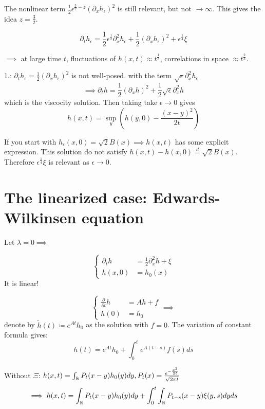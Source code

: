 The nonlinear term $\frac{1}{2}\epsilon^{\frac{3}{2}-z}(\partial_x h_\epsilon)^2$ is still relevant, but not $\to\infty$. This gives the idea 
$z=\frac{3}{2}$.

\[\partial_t h_\epsilon = \frac{1}{2}\epsilon^{\frac{1}{2}}\partial_x^2 h_\epsilon + \frac{1}{2}(\partial_x h_\epsilon)^2 + \epsilon^{\frac{1}{4}}\xi\]

$\implies$ at large time $t$, fluctuations of $h(x,t)\approx t^{\frac{1}{3}}$, correlations in space $\approx t^\frac{2}{3}$.


1.: $\partial_t h_\epsilon = \frac{1}{2}(\partial_x h_\epsilon)^2$ is not well-posed.
with the term $\sqrt{\epsilon}\partial_x^2 h_\epsilon$
\[\implies \partial_t h = \frac{1}{2}(\partial_x h)^2+\frac{1}{2}\sqrt{\epsilon}\partial_x^2h\]
which is the viscocity solution. Then taking take $\epsilon\to 0$ gives \[h(x,t)=\sup_{y}(h(y,0)-\frac{(x-y)^2}{2t})\]

If you start with $h_\epsilon(x,0)=\sqrt{2}B(x)\implies h(x,t)$ has some explicit expression. This solution 
do not satisfy $h(x,t)-h(x,0)\stackrel{d}{=}\sqrt{2}B(x)$. Therefore $\epsilon^{\frac{1}{4}}\xi$ is relevant as $\epsilon\to 0$.

\section{The linearized case: Edwards-Wilkinsen equation}

Let $\lambda=0\implies$

\begin{equation}\label{Edwards-Wilkinsen}
    \begin{cases}
        \partial_t h  &= \frac{1}{2}\partial_x^2 h+\xi\\
        h(x,0)&=h_0(x)
    \end{cases}
\end{equation}
It is linear!
\begin{remark}
    \[\begin{cases}
        \frac{\partial}{\partial t}h &= Ah +f\\
        h(0)&=h_0
    \end{cases}\implies\]
    denote by $\tilde{h}(t)\coloneqq e^{At}h_0$ as the solution with $f=0$. The variation of constant formula gives:
    \[h(t)=e^{At}h_0+\int_0^te^{A(t-s)}f(s)ds\]

Without $\Xi$: $h(x,t)=\int_{\mathbb{R}} P_t(x-y)h_0(y)dy,P_t(x)=\frac{e^{-\frac{x^2}{2t}}}{\sqrt{2\pi t}}$
\[\implies h(x,t)=\int_{\mathbb{R}} P_t(x-y)h_0(y)dy+\int_0^t\int_{\mathbb{R}} P_{t-s}(x-y)\xi(y,s)dyds\]
\end{remark}

